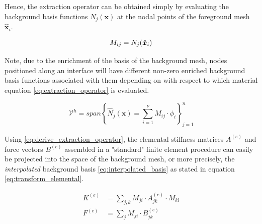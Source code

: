 Hence, the extraction operator can be obtained simply by evaluating the background basis functions $N_j(\bm{x})$ at the nodal points of the foreground mesh $\hat{\bm{x}}_i$.

\begin{equation}
\label{eq:extraction_operator}
    M_{ij} =  N_j(\hat{\bm{x}}_i)\\
\end{equation}

Note, due to the enrichment of the basis of the background mesh, nodes positioned along an interface will have different non-zero enriched background basis functions associated with them depending on with respect to which material equation \eqref{eq:extraction_operator} is evaluated.  

\begin{equation}
\label{eq:interpolated_basis}
    \mathcal{V}^h = span\left\{ 
        \widehat{N}_j(\bm{x}) = \sum_{i=1}^{\nu} M_{ij} \cdot \phi_i
    \right\}_{j=1}^{n}
\end{equation}

Using \eqref{eq:derive_extraction_operator}, the elemental stiffness matrices $A^{(e)}$ and force vectors $B^{(e)}$ assembled in a "standard" finite element procedure can easily be projected into the space of the background mesh, or more precisely, the \emph{interpolated} background basis \eqref{eq:interpolated_basis} as stated in equation \eqref{eq:transform_elemental}.

\begin{equation}
    \label{eq:transform_elemental}
    \begin{split}
        K^{(e)} &= \sum_{j,k} M_{ji} \cdot A^{(e)}_{jk} \cdot M_{kl} \\
        F^{(e)} &= \sum_{j} M_{ji} \cdot B^{(e)}_{jk}  \\
    \end{split}
\end{equation}